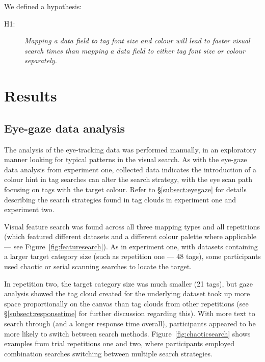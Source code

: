 We defined a hypothesis:

\begin{description}
\item[H1:]\textit{Mapping a data field to tag font size and colour will lead to faster visual search times than mapping a data field to either tag font size or colour separately.}
\end{description}

\section{Results}\label{sect:exp2results}

\subsection{Eye-gaze data analysis} \label{subsect:eyegaze2}
The analysis of the eye-tracking data was performed manually, in an exploratory manner looking for typical patterns in the visual search. As with the eye-gaze data analysis from experiment one, collected data indicates the introduction of a colour hint in tag searches can alter the search strategy, with the eye scan path focusing on tags with the target colour. Refer to \S\ref{subsect:eyegaze} for details describing the search strategies found in tag clouds in experiment one and experiment two.

Visual feature search was found across all three mapping types and all repetitions   (which featured different datasets and a different colour palette where applicable --- see Figure~\vref{fig:featuresearch}). As in experiment one, with datasets containing a larger target category size (such as repetition one --- 48 tags), some participants used chaotic or serial scanning searches to locate the target. 

In repetition two, the target category size was much smaller (21 tags), but gaze analysis showed the tag cloud created for the underlying dataset took up more space proportionally on the canvas than tag clouds from other repetitions (see \S\ref{subsect:responsetime} for further discussion regarding this). With more text to search through (and a longer response time overall), participants appeared to be more likely to switch between search methods. Figure~\vref{fig:chaoticsearch} shows examples from trial repetitions one and two, where participants employed combination searches switching between multiple search strategies.

